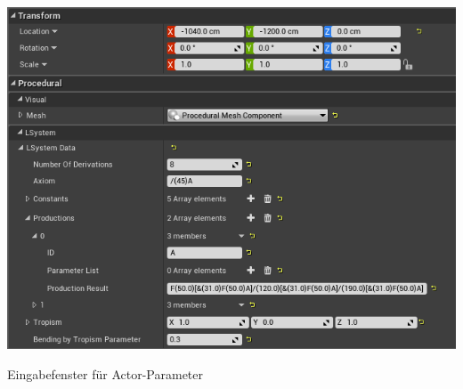 \begin{center}
	\includegraphics[height=0.9\textheight]{images/CH1_EditorExample2.png}
	
	Eingabefenster für Actor-Parameter
\end{center}



\newpage
{}
